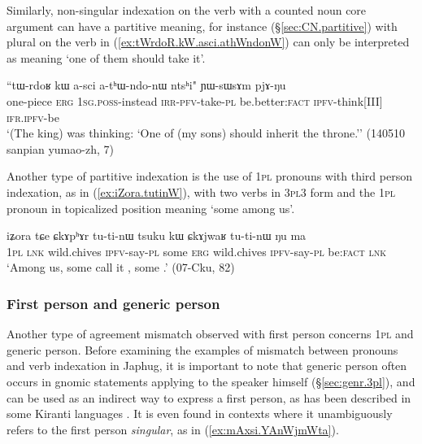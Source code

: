 
Similarly, non-singular indexation on the verb with a counted noun core argument can have a partitive meaning, for instance  (§\ref{sec:CN.partitive}) with plural  on the verb in (\ref{ex:tWrdoR.kW.asci.athWndonW}) can only be interpreted as meaning `one of them should take it'.

\begin{exe}
\ex   \label{ex:tWrdoR.kW.asci.athWndonW}
 \gll ``tɯ-rdoʁ kɯ a-sci a-tʰɯ-ndo-nɯ ntsʰi" ɲɯ-sɯsɤm pjɤ-ŋu \\
one-piece \textsc{erg} \textsc{1sg}.\textsc{poss}-instead \textsc{irr}-\textsc{pfv}-take-\textsc{pl} be.better:\textsc{fact} \textsc{ipfv}-think[III] \textsc{ifr}.\textsc{ipfv}-be \\
\glt `(The king) was thinking: `One of (my sons) should inherit the throne.'' (140510 sanpian yumao-zh, 7)
\end{exe} 

Another type of partitive indexation is the use of \textsc{1pl} pronouns with third person indexation, as in (\ref{ex:iZora.tutinW}), with two verbs in \textsc{3pl}\fl{}3 form and the \textsc{1pl} pronoun in topicalized position meaning `some among us'.

\begin{exe}
\ex   \label{ex:iZora.tutinW}
 \gll  iʑora tɕe ɕkɤpʰɤr tu-ti-nɯ tsuku kɯ ɕkɤjwaʁ tu-ti-nɯ ŋu ma \\
 \textsc{1pl} \textsc{lnk} wild.chives \textsc{ipfv}-say-\textsc{pl} some \textsc{erg}  wild.chives \textsc{ipfv}-say-\textsc{pl} be:\textsc{fact} \textsc{lnk} \\
\glt `Among us, some call it , some .' (07-Cku, 82)
\end{exe} 

\subsubsection{First person and generic person} \label{sec:1.genr}
Another type of agreement mismatch observed with first person concerns \textsc{1pl} and generic person. Before examining the examples of mismatch between pronouns and verb indexation in Japhug, it is important to note that generic person often occurs in gnomic statements applying to the speaker himself (§\ref{sec:genr.3pl}), and can be used as an indirect way to express a first person, as has been described in some Kiranti languages \citep{bickel15antipassive}. It is even found in contexts where it unambiguously refers to the first person \textit{singular}, as in (\ref{ex:mAxsi.YAnWjmWta}).

